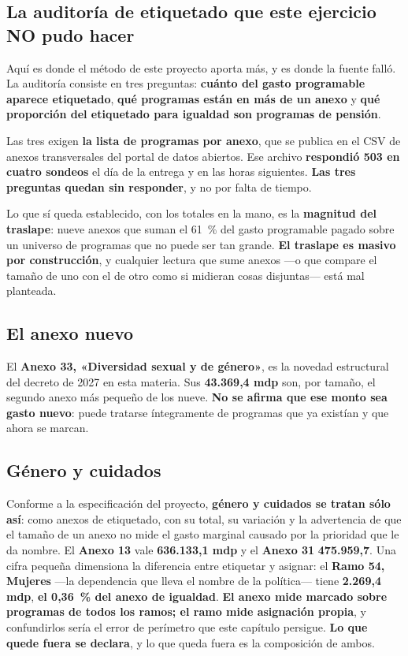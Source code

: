 \subsection*{La auditoría de etiquetado que este ejercicio NO pudo hacer}

Aquí es donde el método de este proyecto aporta más, y es donde la fuente falló. La
auditoría consiste en tres preguntas: \textbf{cuánto del gasto programable aparece
etiquetado}, \textbf{qué programas están en más de un anexo} y \textbf{qué proporción del
etiquetado para igualdad son programas de pensión}.

Las tres exigen \textbf{la lista de programas por anexo}, que se publica en el CSV de anexos
transversales del portal de datos abiertos. Ese archivo \textbf{respondió 503 en cuatro
sondeos} el día de la entrega y en las horas siguientes. \textbf{Las tres preguntas quedan
sin responder}, y no por falta de tiempo.

Lo que sí queda establecido, con los totales en la mano, es la \textbf{magnitud del
traslape}: nueve anexos que suman el 61~\% del gasto programable pagado sobre un universo de
programas que no puede ser tan grande. \textbf{El traslape es masivo por construcción}, y
cualquier lectura que sume anexos ---o que compare el tamaño de uno con el de otro como si
midieran cosas disjuntas--- está mal planteada.

\subsection*{El anexo nuevo}

El \textbf{Anexo 33, «Diversidad sexual y de género»}, es la novedad estructural del decreto
de 2027 en esta materia. Sus \textbf{43.369,4 mdp} son, por tamaño, el segundo anexo más
pequeño de los nueve. \textbf{No se afirma que ese monto sea gasto nuevo}: puede tratarse
íntegramente de programas que ya existían y que ahora se marcan.

\subsection*{Género y cuidados}

Conforme a la especificación del proyecto, \textbf{género y cuidados se tratan sólo así}:
como anexos de etiquetado, con su total, su variación y la advertencia de que el tamaño de un
anexo no mide el gasto marginal causado por la prioridad que le da nombre. El
\textbf{Anexo 13} vale \textbf{636.133,1 mdp} y el \textbf{Anexo 31} \textbf{475.959,7}. Una cifra pequeña dimensiona la diferencia entre etiquetar y asignar: el
\textbf{Ramo 54, Mujeres} ---la dependencia que lleva el nombre de la política--- tiene
\textbf{2.269,4 mdp}, \textbf{el 0,36~\% del anexo de igualdad}. \textbf{El anexo mide
marcado sobre programas de todos los ramos; el ramo mide asignación propia}, y confundirlos
sería el error de perímetro que este capítulo persigue.
\textbf{Lo que quede fuera se declara}, y lo que queda fuera es la composición de ambos.

